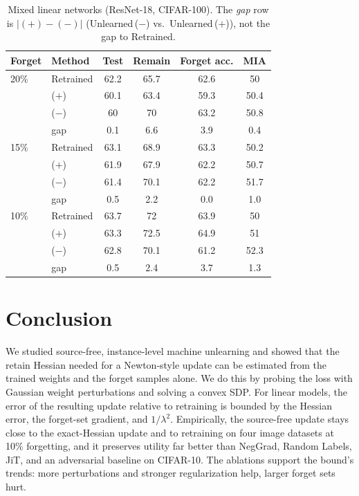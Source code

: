 \documentclass[10pt,twocolumn,letterpaper]{article}
\begin{document}
\begin{table}[t]
  \centering
  \small
  \setlength{\tabcolsep}{3pt}
  \begin{tabular}{@{}llcccc@{}}
    \toprule
    Forget & Method & Test & Remain & Forget acc. & MIA \\
    \midrule
    20\% & Retrained & 62.2 & 65.7 & 62.6 & 50 \\
    & ($+$) & 60.1 & 63.4 & 59.3 & 50.4 \\
    & ($-$) & 60 & 70 & 63.2 & 50.8 \\
    & gap & 0.1 & 6.6 & 3.9 & 0.4 \\
    \midrule
    15\% & Retrained & 63.1 & 68.9 & 63.3 & 50.2 \\
    & ($+$) & 61.9 & 67.9 & 62.2 & 50.7 \\
    & ($-$) & 61.4 & 70.1 & 62.2 & 51.7 \\
    & gap & 0.5 & 2.2 & 0.0 & 1.0 \\
    \midrule
    10\% & Retrained & 63.7 & 72 & 63.9 & 50 \\
    & ($+$) & 63.3 & 72.5 & 64.9 & 51 \\
    & ($-$) & 62.8 & 70.1 & 61.2 & 52.3 \\
    & gap & 0.5 & 2.4 & 3.7 & 1.3 \\
    \bottomrule
  \end{tabular}
  \caption{Mixed linear networks (ResNet-18, CIFAR-100). The \emph{gap} row is $|(+)-(-)|$ (Unlearned\,($-$) vs.\ Unlearned\,($+$)), not the gap to Retrained.}
  \label{tab:mixed}
\end{table}

\section{Conclusion}
\label{sec:conclusion}
We studied source-free, instance-level machine unlearning and showed that the retain Hessian needed for a Newton-style update can be estimated from the trained weights and the forget samples alone. We do this by probing the loss with Gaussian weight perturbations and solving a convex SDP. For linear models, the error of the resulting update relative to retraining is bounded by the Hessian error, the forget-set gradient, and $1/\lambda^2$. Empirically, the source-free update stays close to the exact-Hessian update and to retraining on four image datasets at 10\% forgetting, and it preserves utility far better than NegGrad, Random Labels, JiT, and an adversarial baseline on CIFAR-10. The ablations support the bound's trends: more perturbations and stronger regularization help, larger forget sets hurt.
\end{document}
